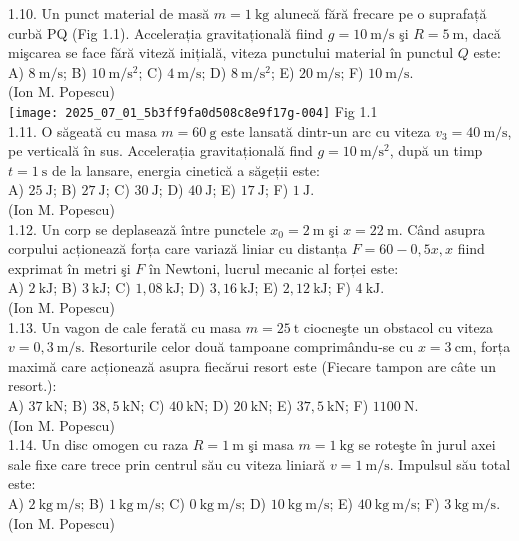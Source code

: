 1.10. Un punct material de masă $m=1 \mathrm{~kg}$ alunecă fără frecare pe o suprafață curbă PQ (Fig 1.1). Accelerația gravitațională fiind $g=10 \mathrm{~m} / \mathrm{s}$ şi $R=5 \mathrm{~m}$, dacă mişcarea se face fără viteză inițială, viteza punctului material în punctul $Q$ este:\\ A) $8 \mathrm{~m} / \mathrm{s}$; B) $10 \mathrm{~m} / \mathrm{s}^{2}$; C) $4 \mathrm{~m} / \mathrm{s}$; D) $8 \mathrm{~m} / \mathrm{s}^{2}$; E) $20 \mathrm{~m} / \mathrm{s}$; F) $10 \mathrm{~m} / \mathrm{s}$.\\ (Ion M. Popescu)\\ \texttt{[image: 2025\_07\_01\_5b3ff9fa0d508c8e9f17g-004]} Fig 1.1\\

1.11. O săgeată cu masa $m=60 \mathrm{~g}$ este lansată dintr-un arc cu viteza $v_{3}=40 \mathrm{~m} / \mathrm{s}$, pe verticală în sus. Accelerația gravitațională find $g=10 \mathrm{~m} / \mathrm{s}^{2}$, după un timp $t=1 \mathrm{~s}$ de la lansare, energia cinetică a săgeții este:\\ A) $25 \mathrm{~J}$; B) $27 \mathrm{~J}$; C) $30 \mathrm{~J}$; D) $40 \mathrm{~J}$; E) $17 \mathrm{~J}$; F) $1 \mathrm{~J}$.\\ (Ion M. Popescu)\\

1.12. Un corp se deplasează între punctele $x_{0}=2 \mathrm{~m}$ şi $x=22 \mathrm{~m}$. Când asupra corpului acționează forța care variază liniar cu distanța $F=60-0,5 x, x$ fiind exprimat în metri şi $F$ în Newtoni, lucrul mecanic al forței este:\\ A) $2 \mathrm{~kJ}$; B) $3 \mathrm{~kJ}$; C) $1,08 \mathrm{~kJ}$; D) $3,16 \mathrm{~kJ}$; E) $2,12 \mathrm{~kJ}$; F) $4 \mathrm{~kJ}$.\\ (Ion M. Popescu)\\

1.13. Un vagon de cale ferată cu masa $m=25 \mathrm{~t}$ ciocneşte un obstacol cu viteza $v=0,3 \mathrm{~m} / \mathrm{s}$. Resorturile celor două tampoane comprimându-se cu $x=3 \mathrm{~cm}$, forța maximă care acționează asupra fiecărui resort este (Fiecare tampon are câte un resort.):\\ A) $37 \mathrm{~kN}$; B) $38,5 \mathrm{~kN}$; C) $40 \mathrm{~kN}$; D) $20 \mathrm{~kN}$; E) $37,5 \mathrm{~kN}$; F) $1100 \mathrm{~N}$.\\ (Ion M. Popescu)\\

1.14. Un disc omogen cu raza $R=1 \mathrm{~m}$ şi masa $m=1 \mathrm{~kg}$ se roteşte în jurul axei sale fixe care trece prin centrul său cu viteza liniară $v=1 \mathrm{~m} / \mathrm{s}$. Impulsul său total este:\\ A) $2 \mathrm{~kg} \mathrm{~m} / \mathrm{s}$; B) $1 \mathrm{~kg} \mathrm{~m} / \mathrm{s}$; C) $0 \mathrm{~kg} \mathrm{~m} / \mathrm{s}$; D) $10 \mathrm{~kg} \mathrm{~m} / \mathrm{s}$; E) $40 \mathrm{~kg} \mathrm{~m} / \mathrm{s}$; F) $3 \mathrm{~kg} \mathrm{~m} / \mathrm{s}$.\\ (Ion M. Popescu)\\

